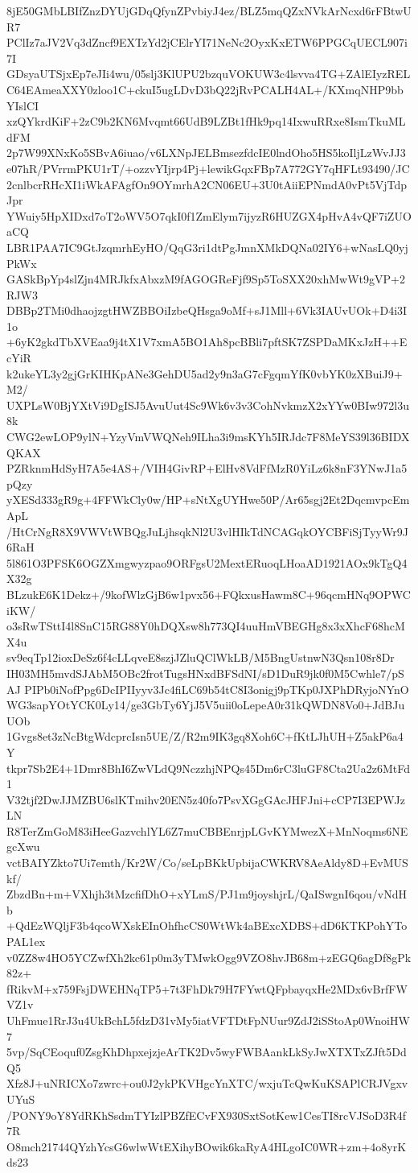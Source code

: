 8jE50GMbLBIfZnzDYUjGDqQfynZPvbiyJ4ez/BLZ5mqQZxNVkArNcxd6rFBtwUR7
PClIz7aJV2Vq3dZncf9EXTzYd2jCElrYI71NeNc2OyxKxETW6PPGCqUECL907i7I
GDsyaUTSjxEp7eJIi4wu/05slj3KlUPU2bzquVOKUW3c4lsvva4TG+ZAlEIyzREL
C64EAmeaXXY0zloo1C+ckuI5ugLDvD3bQ22jRvPCALH4AL+/KXmqNHP9bbYIslCI
xzQYkrdKiF+2zC9b2KN6Mvqmt66UdB9LZBt1fHk9pq14IxwuRRxe8IsmTkuMLdFM
2p7W99XNxKo5SBvA6iuao/v6LXNpJELBmsezfdcIE0lndOho5HS5koIljLzWvJJ3
e07hR/PVrrmPKU1rT/+ozzvYIjrp4Pj+lewikGqxFBp7A772GY7qHFLt93490/JC
2cnlbcrRHcXI1iWkAFAgfOn9OYmrhA2CN06EU+3U0tAiiEPNmdA0vPt5VjTdpJpr
YWuiy5HpXIDxd7oT2oWV5O7qkI0f1ZmElym7ijyzR6HUZGX4pHvA4vQF7iZUOaCQ
LBR1PAA7IC9GtJzqmrhEyHO/QqG3ri1dtPgJmnXMkDQNa02IY6+wNasLQ0yjPkWx
GASkBpYp4slZjn4MRJkfxAbxzM9fAGOGReFjf9Sp5ToSXX20xhMwWt9gVP+2RJW3
DBBp2TMi0dhaojzgtHWZBBOiIzbeQHsga9oMf+sJ1Mll+6Vk3IAUvUOk+D4i3I1o
+6yK2gkdTbXVEaa9j4tX1V7xmA5BO1Ah8pcBBli7pftSK7ZSPDaMKxJzH++EcYiR
k2ukeYL3y2gjGrKIHKpANe3GehDU5ad2y9n3aG7cFgqmYfK0vbYK0zXBuiJ9+M2/
UXPLsW0BjYXtVi9DgISJ5AvuUut4Sc9Wk6v3v3CohNvkmzX2xYYw0BIw972l3u8k
CWG2ewLOP9ylN+YzyVmVWQNeh9ILha3i9msKYh5IRJdc7F8MeYS39l36BIDXQKAX
PZRknmHdSyH7A5e4AS+/VIH4GivRP+ElHv8VdFfMzR0YiLz6k8nF3YNwJ1a5pQzy
yXESd333gR9g+4FFWkCly0w/HP+sNtXgUYHwe50P/Ar65sgj2Et2DqcmvpcEmApL
/HtCrNgR8X9VWVtWBQgJuLjhsqkNl2U3vlHIkTdNCAGqkOYCBFiSjTyyWr9J6RaH
5l861O3PFSK6OGZXmgwyzpao9ORFgsU2MextERuoqLHoaAD1921AOx9kTgQ4X32g
BLzukE6K1Dekz+/9kofWlzGjB6w1pvx56+FQkxusHawm8C+96qcmHNq9OPWCiKW/
o3sRwTSttI4l8SnC15RG88Y0hDQXsw8h773QI4uuHmVBEGHg8x3xXhcF68hcMX4u
sv9eqTp12ioxDeSz6f4cLLqveE8szjJZluQClWkLB/M5BngUstnwN3Qsn108r8Dr
IH03MH5mvdSJAbM5OBc2frotTugsHNxdBFSdNI/sD1DuR9jk0f0M5Cwhle7/pSAJ
PIPb0iNofPpg6DcIPIIyyv3Jc4fiLC69b54tC8I3onigj9pTKp0JXPhDRyjoNYnO
WG3sapYOtYCK0Ly14/ge3GbTy6YjJ5V5uii0oLepeA0r31kQWDN8Vo0+JdBJuUOb
1Gvgs8et3zNcBtgWdcprcIsn5UE/Z/R2m9IK3gq8Xoh6C+fKtLJhUH+Z5akP6a4Y
tkpr7Sb2E4+1Dmr8BhI6ZwVLdQ9NczzhjNPQs45Dm6rC3luGF8Cta2Ua2z6MtFd1
V32tjf2DwJJMZBU6slKTmihv20EN5z40fo7PsvXGgGAcJHFJni+cCP7I3EPWJzLN
R8TerZmGoM83iHeeGazvchlYL6Z7muCBBEnrjpLGvKYMwezX+MnNoqms6NEgcXwu
vctBAIYZkto7Ui7emth/Kr2W/Co/seLpBKkUpbijaCWKRV8AeAldy8D+EvMUSkf/
ZbzdBn+m+VXhjh3tMzcfifDhO+xYLmS/PJ1m9joyshjrL/QaISwgnI6qou/vNdHb
+QdEzWQljF3b4qcoWXskEInOhfhcCS0WtWk4aBExcXDBS+dD6KTKPohYToPAL1ex
v0ZZ8w4HO5YCZwfXh2kc61p0m3yTMwkOgg9VZO8hvJB68m+zEGQ6agDf8gPk82z+
fRikvM+x759FsjDWEHNqTP5+7t3FhDk79H7FYwtQFpbayqxHe2MDx6vBrfFWVZ1v
UhFmue1RrJ3u4UkBchL5fdzD31vMy5iatVFTDtFpNUur9ZdJ2iSStoAp0WnoiHW7
5vp/SqCEoquf0ZsgKhDhpxejzjeArTK2Dv5wyFWBAankLkSyJwXTXTxZJft5DdQ5
Xfz8J+uNRICXo7zwrc+ou0J2ykPKVHgcYnXTC/wxjuTcQwKuKSAPlCRJVgxvUYuS
/PONY9oY8YdRKhSsdmTYIzlPBZfECvFX930SxtSotKew1CesTI8rcVJSoD3R4f7R
O8mch21744QYzhYcsG6wlwWtEXihyBOwik6kaRyA4HLgoIC0WR+zm+4o8yrKds23
